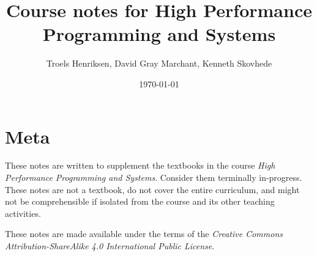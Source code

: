 \documentclass[oneside]{memoir}
\title{Course notes for High Performance Programming and Systems}
\author{Troels Henriksen, David Gray Marchant, Kenneth Skovhede} \date{\today}
\begin{document}
\maketitle

\section{Meta}

These notes are written to supplement the textbooks in the course
\textit{High Performance Programming and Systems}.  Consider them
terminally in-progress.  These notes are not a textbook, do not cover
the entire curriculum, and might not be comprehensible if isolated
from the course and its other teaching activities.

These notes are made available under the terms of the \emph{Creative
  Commons Attribution-ShareAlike 4.0 International Public License}.

\newpage
\tableofcontents

\newpage
\listoftheorems[title=Definitions,ignoreall,show={definition}]

























\newpage



\end{document}

